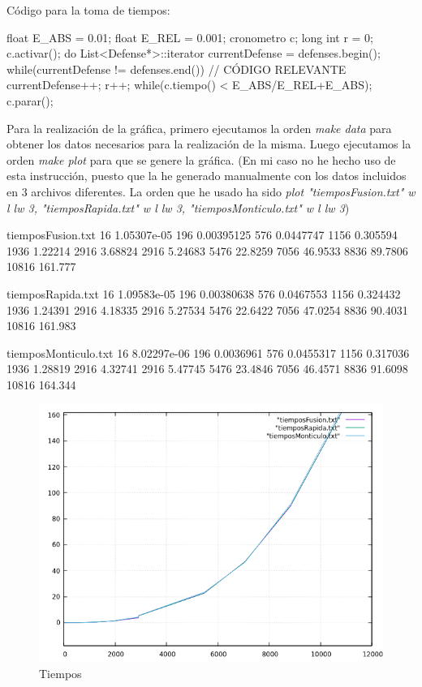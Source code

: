 Código para la toma de tiempos:

float E_ABS = 0.01;
float E_REL = 0.001;
cronometro c;
    long int r = 0;
    c.activar();
    do {	
		List<Defense*>::iterator currentDefense = defenses.begin();
		while(currentDefense != defenses.end()) {
			// CÓDIGO RELEVANTE
            currentDefense++;
		}
		r++;
    } while(c.tiempo() < E_ABS/E_REL+E_ABS);
    c.parar();

Para la realización de la gráfica, primero ejecutamos la orden \textit{make data} para obtener los datos necesarios para la realización de la misma.
Luego ejecutamos la orden \textit{make plot} para que se genere la gráfica. (En mi caso no he hecho uso de esta instrucción, puesto que la he generado manualmente con los datos incluidos en 3 archivos diferentes. La orden que he usado ha sido \textit{plot "tiemposFusion.txt" w l lw 3, "tiemposRapida.txt" w l lw 3, "tiemposMonticulo.txt" w l lw 3})

tiemposFusion.txt
16	1.05307e-05
196	0.00395125
576	0.0447747
1156	0.305594
1936	1.22214
2916	3.68824
2916	5.24683
5476	22.8259
7056	46.9533
8836	89.7806
10816	161.777

tiemposRapida.txt
16	1.09583e-05
196	0.00380638
576	0.0467553
1156	0.324432
1936	1.24391
2916	4.18335
2916	5.27534
5476	22.6422
7056	47.0254
8836	90.4031
10816	161.983

tiemposMonticulo.txt
16	8.02297e-06
196	0.0036961
576	0.0455317
1156	0.317036
1936	1.28819
2916	4.32741
2916	5.47745
5476	23.4846
7056	46.4571
8836	91.6098
10816	164.344

\begin{figure}
\centering
\includegraphics[width=0.7\linewidth]{./grafica}
\caption{Tiempos}
\label{fig:grafica}
\end{figure}